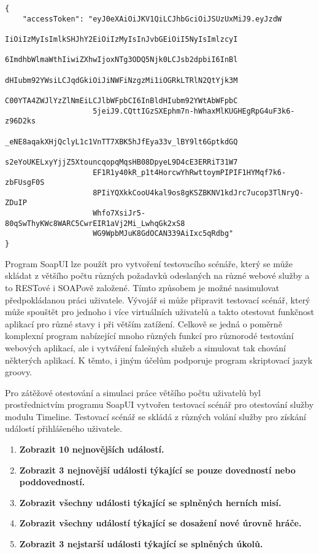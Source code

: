\documentclass[twoside, 12pt]{article}
\begin{document}
{{\begin{lstlisting}
{
    "accessToken": "eyJ0eXAiOiJKV1QiLCJhbGciOiJSUzUxMiJ9.eyJzdW
                    IiOiIzMyIsImlkSHJhY2EiOiIzMyIsInJvbGEiOiI5NyIsImlzcyI
                    6ImdhbWlmaWthIiwiZXhwIjoxNTg3ODQ5Njk0LCJsb2dpbiI6InBl
                    dHIubm92YWsiLCJqdGkiOiJiNWFiNzgzMi1iOGRkLTRlN2QtYjk3M
                    C00YTA4ZWJlYzZlNmEiLCJlbWFpbCI6InBldHIubm92YWtAbWFpbC
                    5jeiJ9.CQttIGzSXEphm7n-hWhaxMlKUGHEgRpG4uF3k6-z96D2ks
                    _eNE8aqakXHjQclyL1c1VnTT7XBK5hJfEya33v_lBY9lt6GptkdGQ
                    s2eYoUKELxyYjjZ5XtouncqopqMqsHB08DpyeL9D4cE3ERRiT31W7
                    EF1R1y40kR_p1t4HorcwYhRwttoymPIPIF1HYMqf7k6-zbFUsgF0S
                    8PIiYQXkkCooU4kal9os8gKSZBKNV1kdJrc7ucop3TlNryQ-ZDuIP
                    Whfo7XsiJr5-80qSwThyKWc8WARC5CwrEIR1aVj2Mi_LwhqGk2xS8
                    WG9WpbMJuK8GdOCAN339AiIxc5qRdbg"
}
\end{lstlisting}

\vspace{10}


Program SoapUI lze použít pro vytvoření testovacího scénáře,
který se může skládat z většího počtu různých požadavků odeslaných na různé webové služby a
to RESTové i SOAPově založené. Tímto způsobem je možné nasimulovat předpokládanou práci uživatele.
Vývojář si může připravit testovací scénář, který může spouštět pro jednoho i více virtuálních uživatelů a
takto otestovat funkčnost aplikací pro různé stavy i při větším zatížení.
Celkově se jedná o poměrně komplexní program nabízející mnoho různých funkcí
pro různorodé testování webových aplikací, ale i vytváření falešných služeb a simulovat tak chování některých aplikací.
K těmto, i jiným účelům podporuje program skriptovací jazyk groovy.

Pro zátěžové otestování a simulaci práce většího počtu uživatelů byl prostřednictvím
programu SoapUI vytvořen testovací scénář pro otestování služby modulu Timeline.
Testovací scénář se skládá z různých volání služby pro získání událostí přihlášeného uživatele.


\begin{enumerate}
\item \textbf{Zobrazit 10 nejnovějších událostí.}
\item \textbf{Zobrazit 3 nejnovější události týkající se pouze dovedností nebo poddovedností.}
\item \textbf{Zobrazit všechny události týkající se splněných herních misí.}
\item \textbf{Zobrazit všechny událostí týkající se dosažení nové úrovně hráče.}
\item \textbf{Zobrazit 3 nejstarší události týkající se splněných úkolů.}
\end{enumerate}


}}
\end{document}

